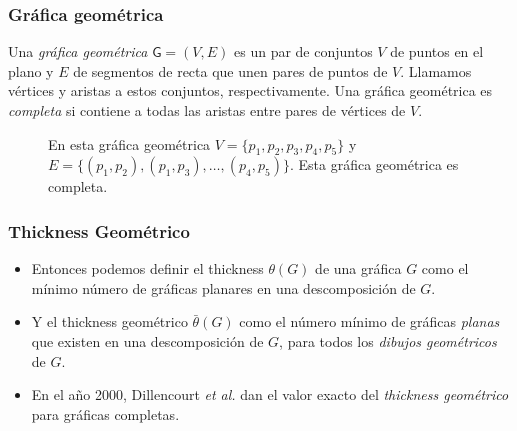 \begin{frame}
\frametitle{Gráfica geométrica}
Una \emph{gráfica geométrica} $\mathsf{G}=(V,E)$ es un par de conjuntos $V$ de puntos en el plano y $E$ de 
segmentos de recta que unen pares de puntos de $V$. Llamamos vértices y aristas a estos conjuntos,
respectivamente. Una gráfica geométrica es \emph{completa} si contiene a todas las 
aristas entre pares de vértices de $V$.
\begin{figure}
	\centering
	\caption{En esta gráfica geométrica $V=\{p_1,p_2,p_3,p_4,p_5\}$ y $E=\{(p_1,p_2),(p_1,p_3),\dots,(p_4,p_5)\}			$. Esta gráfica geométrica es completa.}
\end{figure}
\end{frame}
\begin{frame}\frametitle{Thickness Geométrico}
	\begin{itemize}
		\item[] Entonces podemos definir el thickness $\theta(G)$ de una gráfica $G$ como el mínimo número de gráficas planares en una descomposición de $G$. 
		
		\item[] Y el thickness geométrico $\bar{\theta}(G)$ como el número mínimo de gráficas \emph{planas} que existen en una descomposición de $G$, para todos los \emph{dibujos geométricos} de $G$.
		
		\item[] En el año 2000, Dillencourt \emph{et al.} dan el valor exacto del \emph{thickness geométrico} para gráficas completas.\\[5pt]
	\end{itemize}
	
\end{frame}
